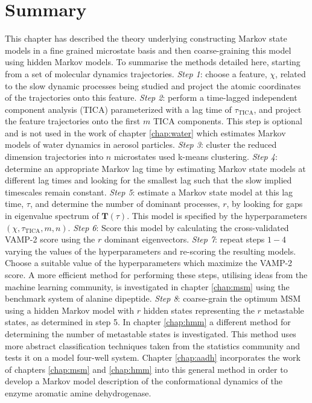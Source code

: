 \section{Summary}
This chapter has described the theory underlying constructing Markov state models in a fine grained microstate basis and then coarse-graining this model using hidden Markov models. To summarise the methods detailed here, starting from a set of molecular dynamics trajectories.  \emph{Step 1}: choose a feature, $\chi$, related to the slow dynamic processes being studied and project the atomic coordinates of the trajectories onto this feature. \emph{Step 2}: perform a time-lagged independent component analysis (TICA) parameterized with a lag time of $\tau_{\mathrm{TICA}}$, and project the feature trajectories onto the first $m$ TICA components. This step is optional and is not used in the work of chapter \ref{chap:water} which estimates Markov models of water dynamics in aerosol particles. \emph{Step 3}: cluster the reduced dimension trajectories into $n$ microstates used k-means clustering. \emph{Step 4}: determine an appropriate Markov lag time by estimating Markov state models at different lag times and looking for the smallest lag such that the slow implied timescales remain constant. \emph{Step 5}: estimate a Markov state model at this lag time, $\tau$, and determine the number of dominant processes, $r$, by looking for gaps in eigenvalue spectrum of $\mathbf{T}(\tau)$. This model is specified by the hyperparameters $(\chi,\tau_{\mathrm{TICA}}, m, n)$.  \emph{Step 6}: Score this model by calculating the cross-validated VAMP-2 score using the $r$ dominant eigenvectors.  \emph{Step 7}: repeat steps $1-4$ varying the values of the hyperparameters and re-scoring the resulting models.  Choose a suitable value of the hyperparameters which maximize the VAMP-2 score.  A more efficient method for performing these steps, utilising ideas from the machine learning community, is investigated in chapter \ref{chap:msm} using the benchmark system of alanine dipeptide. \emph{Step 8}: coarse-grain the optimum MSM using a hidden Markov model with $r$ hidden states representing the $r$ metastable states, as determined in step 5.  In chapter \ref{chap:hmm} a different method for determining the number of metastable states is investigated. This method uses more abstract classification techniques taken from the statistics community and tests it on a model four-well system.  Chapter \ref{chap:aadh} incorporates the work of chapters \ref{chap:msm} and \ref{chap:hmm} into this general method in order to develop a Markov model description of the conformational dynamics of the enzyme aromatic amine dehydrogenase. 


